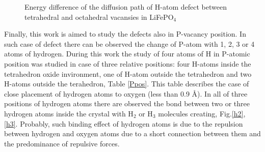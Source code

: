 \begin{figure}[h]
\begin{minipage}[h]{1\linewidth}
\end{minipage}
\caption{Energy difference of the diffusion path of H-atom defect between tetrahedral and octahedral vacansies in LiFePO$_4$}
\label{difpath}
\end{figure}

Finally, this work is aimed to study the defects also in P-vacancy position. In such case of defect there can be observed the change of P-atom with 1, 2, 3 or 4 atoms of hydrogen. During this work the study of four atoms of H in P-atomic position was studied in case of three relative positions: four H-atoms inside the tetrahedron oxide invironment, one of H-atom outside the tetrahedron and two H-atoms outside the terahedron, Table \ref{Ppos}. This table describes the case of close placement of hydrogen atoms to oxygen (less than 0.9 \AA). In all of three positions of hydrogen atoms there are observed the bond between two or three hydrogen atoms inside the crystal with H$_2$ or H$_3$ molecules creating, Fig.\ref{h2}, \ref{h3}. Probably, such binding effect of hydrogen atoms is due to the repulsion between hydrogen and oxygen atoms due to a short connection between them and the predominance of repulsive forces.

